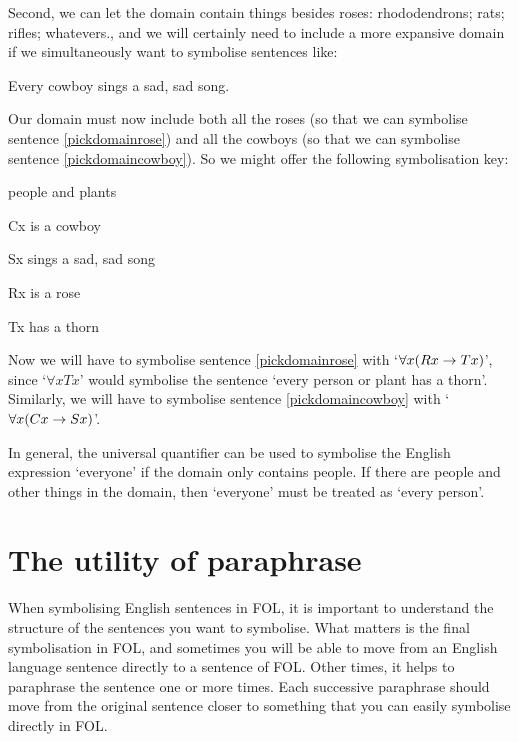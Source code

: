 Second, we can let the domain contain things besides roses: rhododendrons; rats; rifles; whatevers., and we will certainly need to include a more expansive domain if we simultaneously want to symbolise sentences like:
	\begin{earg}
		\item[\ex{pickdomaincowboy}] Every cowboy sings a sad, sad song.
	\end{earg}
Our domain must now include both all the roses (so that we can symbolise sentence \ref{pickdomainrose}) and all the cowboys (so that we can symbolise sentence \ref{pickdomaincowboy}). So we might offer the following symbolisation key:
	\begin{ekey}
		\item[\text{domain}] people and plants
		\item[Cx]  is a cowboy
		\item[Sx]  sings a sad, sad song
		\item[Rx]  is a rose
		\item[Tx]  has a thorn
	\end{ekey}
Now we will have to symbolise sentence \ref{pickdomainrose} with `$\forall x (Rx \rightarrow Tx)$', since `$\forall x Tx$' would symbolise the sentence `every person or plant has a thorn'. Similarly, we will have to symbolise sentence \ref{pickdomaincowboy} with `$\forall x (Cx \rightarrow Sx)$'. 

In general, the universal quantifier can be used to symbolise the English expression `everyone' if the domain only contains people. If there are people and other things in the domain, then `everyone' must be treated as `every person'.


\section{The utility of paraphrase}
When symbolising English sentences in FOL, it is important to understand the structure of the sentences you want to symbolise. What matters is the final symbolisation in FOL, and sometimes you will be able to move from an English language sentence directly to a sentence of FOL. Other times, it helps to paraphrase the sentence one or more times. Each successive paraphrase should move from the original sentence closer to something that you can easily symbolise directly in FOL.

